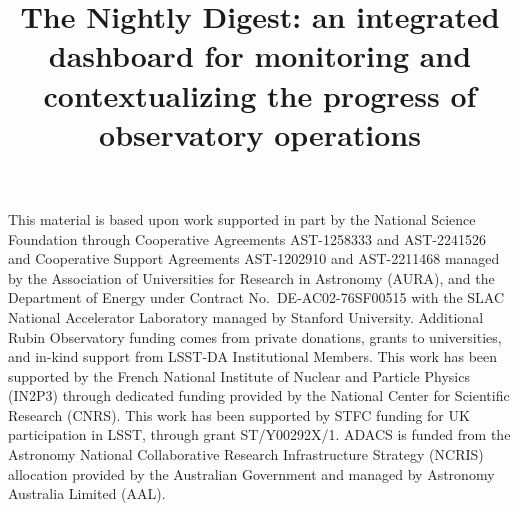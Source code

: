 \documentclass[]{spie}
\begin{document}

\title{The Nightly Digest: an integrated dashboard for monitoring and contextualizing the progress of observatory operations}


\maketitle





\acknowledgments

This material is based upon work supported in part by the National Science Foundation through Cooperative Agreements AST-1258333 and AST-2241526 and Cooperative Support Agreements AST-1202910 and AST-2211468 managed by the Association of Universities for Research in Astronomy (AURA), and the Department of Energy under Contract No.\ DE-AC02-76SF00515 with the SLAC National Accelerator Laboratory managed by Stanford University.
Additional Rubin Observatory funding comes from private donations, grants to universities, and in-kind support from LSST-DA Institutional Members.
This work has been supported by the French National Institute of Nuclear and Particle Physics (IN2P3) through dedicated funding provided by the National Center for Scientific Research (CNRS). 
This work has been supported by STFC funding for UK participation in LSST, through grant ST/Y00292X/1. 
ADACS is funded from the Astronomy National Collaborative Research Infrastructure Strategy (NCRIS) allocation provided by the Australian Government and managed by Astronomy Australia Limited (AAL).



\end{document}
